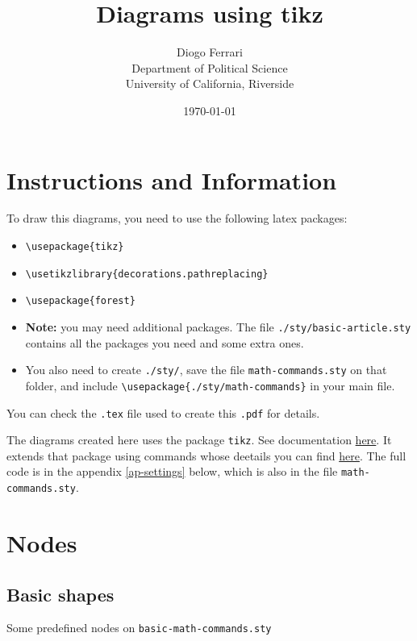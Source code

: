 \documentclass[a4paper]{article}
\author{Diogo Ferrari\\
Department of Political Science\\
University of California, Riverside\\
}
\date{\today}
\title{Diagrams using tikz}
\begin{document}
\maketitle
\tableofcontents

\pagebreak
\section{Instructions and Information}
\label{sec:org6fbaa42}

To draw this diagrams, you need to use the following latex packages:
\begin{itemize}
\item \texttt{\textbackslash{}usepackage\{tikz\}}
\item \texttt{\textbackslash{}usetikzlibrary\{decorations.pathreplacing\}}
\item \texttt{\textbackslash{}usepackage\{forest\}}
\item \textbf{Note:} you may need additional packages. The file \texttt{./sty/basic-article.sty} contains all the packages you need and some extra ones.
\item You also need to create \texttt{./sty/}, save the file \texttt{math-commands.sty} on that folder, and include \texttt{\textbackslash{}usepackage\{./sty/math-commands\}} in your main file.
\end{itemize}

You can check the \texttt{.tex} file used to create this \texttt{.pdf} for details.

The diagrams created here uses the package \texttt{tikz}. See documentation \href{https://ctan.org/pkg/pgf?lang=en}{here}. It extends that package using commands whose deetails you can find \href{https://github.com/jluttine/tikz-bayesnet}{here}. The full code is in the appendix \ref{ap-settings} below, which is also in the file \texttt{math-commands.sty}.


\section{Nodes}
\label{sec:org7782001}
\subsection{Basic shapes}
\label{sec:org6281fb5}
Some predefined nodes on \texttt{basic-math-commands.sty}
\end{document}
